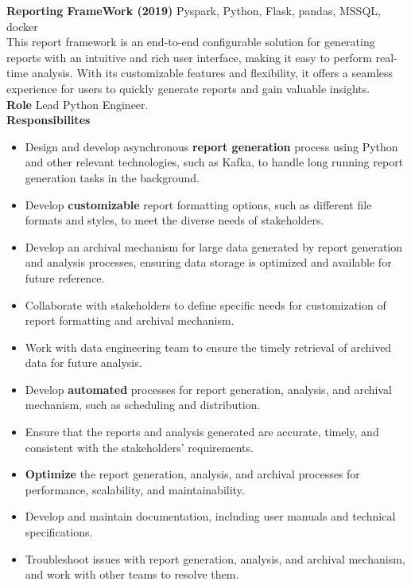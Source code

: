 \documentclass[a4paper]{article}
\begin{document}
{\textbf{Reporting FrameWork (2019)}} {\hfill Pyspark, Python, Flask, pandas, MSSQL, docker} \\
\vspace{1mm}
This report framework is an end-to-end configurable solution for generating reports with an intuitive and rich user interface, making it easy to perform real-time analysis. With its customizable features and flexibility, it offers a seamless experience for users to quickly generate reports and gain valuable insights.\\
\vspace{1mm}
\textbf{Role}
Lead Python Engineer.\\
\vspace{1mm}
\textbf{Responsibilites} \\
\begin{itemize} \itemsep 1pt
\item Design and develop asynchronous \textbf{report generation} process using Python and other relevant technologies, such as Kafka, to handle long running report generation tasks in the background.
\item Develop \textbf{customizable} report formatting options, such as different file formats and styles, to meet the diverse needs of stakeholders.
\item Develop an archival mechanism for large data generated by report generation and analysis processes, ensuring data storage is optimized and available for future reference.
\item Collaborate with stakeholders to define specific needs for customization of report formatting and archival mechanism.
\item Work with data engineering team to ensure the timely retrieval of archived data for future analysis.
\item Develop \textbf{automated} processes for report generation, analysis, and archival mechanism, such as scheduling and distribution.
\item Ensure that the reports and analysis generated are accurate, timely, and consistent with the stakeholders' requirements.
\item \textbf{Optimize} the report generation, analysis, and archival processes for performance, scalability, and maintainability.
\item Develop and maintain documentation, including user manuals and technical specifications.
\item Troubleshoot issues with report generation, analysis, and archival mechanism, and work with other teams to resolve them.

\end{itemize}
\end{document}

